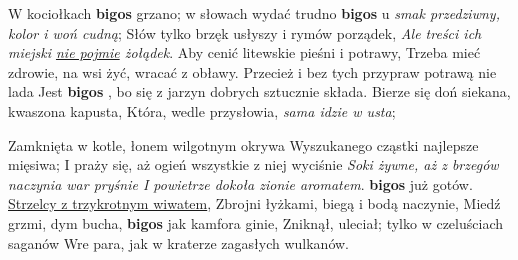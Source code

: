 W kociołkach \textbf{bigos} grzano; w słowach wydać trudno
\textbf{bigos} u \textit{smak przedziwny, kolor i woń cudną};
Słów tylko brzęk usłyszy i rymów porządek,
\textit{Ale treści ich miejski \underline{nie pojmie} żołądek}.
Aby cenić litewskie pieśni i potrawy,
Trzeba mieć zdrowie, na wsi żyć, wracać z obławy.
Przecież i bez tych przypraw potrawą nie lada
Jest \textbf{bigos} , bo się z jarzyn dobrych sztucznie składa.
Bierze się doń siekana, kwaszona kapusta,
Która, wedle przysłowia, \textit{sama idzie w usta};

Zamknięta w kotle, łonem wilgotnym okrywa
Wyszukanego cząstki najlepsze mięsiwa;
I praży się, aż ogień wszystkie z niej wyciśnie
\textit{Soki żywne, aż z brzegów naczynia war pryśnie
I powietrze dokoła zionie aromatem}.
\textbf{bigos}  już gotów. \underline{Strzelcy z trzykrotnym wiwatem},
Zbrojni łyżkami, biegą i bodą naczynie,
Miedź grzmi, dym bucha, \textbf{bigos}  jak kamfora ginie,
Zniknął, uleciał; tylko w czeluściach saganów
Wre para, jak w kraterze zagasłych wulkanów.

